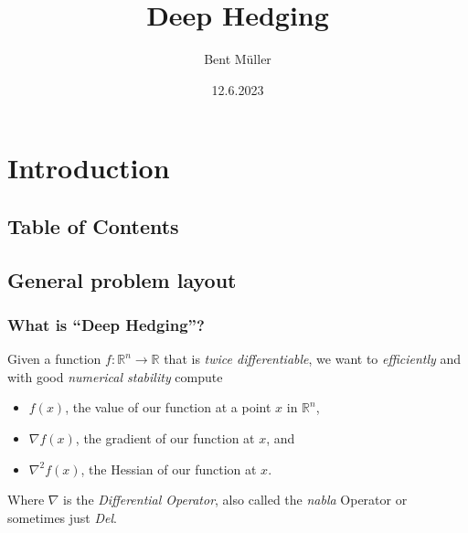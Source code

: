 \documentclass{beamer}
\title{
    Deep Hedging
}
\author{Bent Müller}
\institute{University of Hamburg, Department of Mathematics}
\date{12.6.2023}
\def\R{{\mathbb R}}
\begin{document}
\begin{frame}
    \titlepage
\end{frame}

\section{Introduction}
\subsection{Table of Contents}
\begin{frame}
    \tableofcontents
\end{frame}

\subsection{General problem layout}

\begin{frame}
    \frametitle{What is ``Deep Hedging''?}

    Given a function $f: \R^{n} \longrightarrow \R$ that is
    \textit{twice differentiable}, we want to
    \textit{efficiently}
    and with good \textit{numerical stability} compute
    \vspace{5mm}

    \begin{itemize}
        \item $f(x)$, the value of our function at a point $x$ in $\R^{n}$,
        \item $\nabla f(x)$, the gradient of our function at $x$, and
        \item $\nabla^2 f(x)$, the Hessian of our function at $x$.
    \end{itemize}

    \vspace{5mm}
    Where $\nabla$ is the \textit{Differential Operator}, also called
    the \textit{nabla} Operator or sometimes just \textit{Del}.
\end{frame}

\section{}
\end{document}
